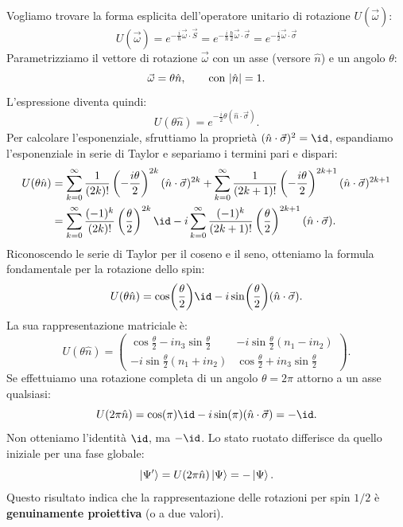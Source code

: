 Vogliamo trovare la forma esplicita dell'operatore unitario di rotazione \(U(\vec{\omega})\):
\[
    U(\vec{\omega}) = e^{-\frac{i}{\hbar}\vec{\omega}\cdot\vec{S}}
    = e^{-\frac{i}{\hbar}\frac{\hbar}{2}\vec{\omega}\cdot\vec{\sigma}} = e^{-\frac{i}{2}\vec{\omega}\cdot\vec{\sigma}}
\]
Parametrizziamo il vettore di rotazione \(\vec{\omega}\) con un asse (versore \(\hat{n}\)) e un angolo \(\theta\):
\[
    \vec{\omega} = \theta \hat{n}, \qquad \text{con } \abs{\hat{n}}=1.
\]
L'espressione diventa quindi:
\[
    U(\theta \hat{n}) = e^{-\frac{i}{2}\theta (\hat{n}\cdot\vec{\sigma})}.
\]
Per calcolare l'esponenziale, sfruttiamo la proprietà \((\hat{n}\cdot\vec{\sigma})^2 = \id\),
espandiamo l'esponenziale in serie di Taylor e separiamo i termini pari e dispari:
\begin{align*}
    U(\theta\hat{n}) &= \sum_{k=0}^{\infty} \frac{1}{(2k)!} \left(-\frac{i\theta}{2}\right)^{2k} (\hat{n}\cdot\vec{\sigma})^{2k} + \sum_{k=0}^{\infty} \frac{1}{(2k+1)!} \left(-\frac{i\theta}{2}\right)^{2k+1} (\hat{n}\cdot\vec{\sigma})^{2k+1} \\
    &= \sum_{k=0}^{\infty} \frac{(-1)^k}{(2k)!} \left(\frac{\theta}{2}\right)^{2k} \id - i \sum_{k=0}^{\infty} \frac{(-1)^k}{(2k+1)!} \left(\frac{\theta}{2}\right)^{2k+1} (\hat{n}\cdot\vec{\sigma}).
\end{align*}
Riconoscendo le serie di Taylor per il coseno e il seno, otteniamo la formula fondamentale per la rotazione dello spin:
\begin{equation}
    U(\theta \hat{n}) = \cos(\frac{\theta}{2})\id - i \sin(\frac{\theta}{2}) (\hat{n}\cdot\vec{\sigma}).
\end{equation}
La sua rappresentazione matriciale è:
\[
    U(\theta\hat{n}) =
    \begin{pmatrix}
        \cos\frac{\theta}{2} - i n_3 \sin\frac{\theta}{2} & -i\sin\frac{\theta}{2}(n_1 - i n_2) \\
        -i\sin\frac{\theta}{2}(n_1 + i n_2) & \cos\frac{\theta}{2} + i n_3 \sin\frac{\theta}{2}
    \end{pmatrix}.
\]
Se effettuiamo una rotazione completa di un angolo \(\theta = 2\pi\) attorno a un asse qualsiasi:
\[
    U(2\pi \hat{n}) = \cos(\pi)\id - i \sin(\pi)(\hat{n}\cdot\vec{\sigma}) = -\id.
\]
Non otteniamo l'identità \(\id\), ma \(-\id\). Lo stato ruotato differisce da quello iniziale per una fase globale:
\[
    \ket{\Psi'} = U(2\pi\hat{n})\ket{\Psi} = -\ket{\Psi}.
\]
Questo risultato indica che la rappresentazione delle rotazioni per spin \(1/2\) è \textbf{genuinamente proiettiva} (o a due valori).
